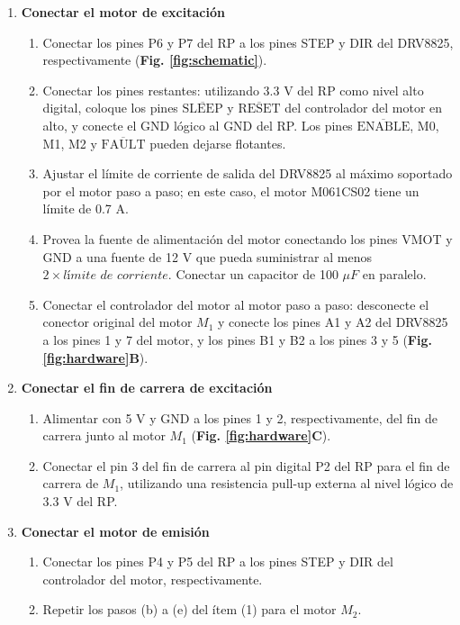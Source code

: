 \begin{enumerate}
    \item \textbf{Conectar el motor de excitación}
    \begin{enumerate}
        \item Conectar los pines P6 y P7 del RP a los pines STEP y DIR del DRV8825, respectivamente (\textbf{Fig. \ref{fig:schematic}}).
        \item Conectar los pines restantes: utilizando 3.3 V del RP como nivel alto digital, coloque los pines $\overline{\text{SLEEP}}$ y $\overline{\text{RESET}}$ del controlador del motor en alto, y conecte el GND lógico al GND del RP. Los pines $\overline{\text{ENABLE}}$, M0, M1, M2 y $\overline{\text{FAULT}}$ pueden dejarse flotantes.
        \item Ajustar el límite de corriente de salida del DRV8825 al máximo soportado por el motor paso a paso; en este caso, el motor M061CS02 tiene un límite de 0.7 A.
        \item Provea la fuente de alimentación del motor conectando los pines VMOT y GND a una fuente de 12 V que pueda suministrar al menos $2 \times \textit{límite de corriente}$. Conectar un capacitor de 100 $\mu F$ en paralelo.
        \item Conectar el controlador del motor al motor paso a paso: desconecte el conector original del motor $M_1$ y conecte los pines A1 y A2 del DRV8825 a los pines 1 y 7 del motor, y los pines B1 y B2 a los pines 3 y 5 (\textbf{Fig. \ref{fig:hardware}B}).
    \end{enumerate}
    \item \textbf{Conectar el fin de carrera de excitación}
    \begin{enumerate}
        \item Alimentar con 5 V y GND a los pines 1 y 2, respectivamente, del fin de carrera junto al motor $M_1$ (\textbf{Fig. \ref{fig:hardware}C}).
        \item Conectar el pin 3 del fin de carrera al pin digital P2 del RP para el fin de carrera de $M_1$, utilizando una resistencia pull-up externa al nivel lógico de 3.3 V del RP.
    \end{enumerate}
    \item \textbf{Conectar el motor de emisión}
    \begin{enumerate}
        \item Conectar los pines P4 y P5 del RP a los pines STEP y DIR del controlador del motor, respectivamente.
        \item Repetir los pasos (b) a (e) del ítem (1) para el motor $M_2$.

\end{enumerate}
\end{enumerate}

